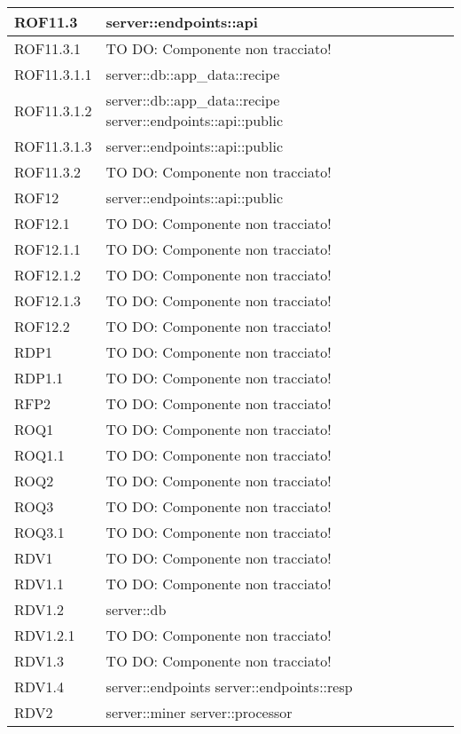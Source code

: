 \begin{center}
\begin{longtable}{| p{4cm} | p{8cm} |}
\hline
ROF11.3 & server::endpoints::api \\
\hline
ROF11.3.1 & TO DO: Componente non tracciato! \\
\hline
ROF11.3.1.1 & server::db::app\_data::recipe \\
\hline
ROF11.3.1.2 & server::db::app\_data::recipe \newline server::endpoints::api::public \\
\hline
ROF11.3.1.3 & server::endpoints::api::public \\
\hline
ROF11.3.2 & TO DO: Componente non tracciato! \\
\hline
ROF12 & server::endpoints::api::public \\
\hline
ROF12.1 & TO DO: Componente non tracciato! \\
\hline
ROF12.1.1 & TO DO: Componente non tracciato! \\
\hline
ROF12.1.2 & TO DO: Componente non tracciato! \\
\hline
ROF12.1.3 & TO DO: Componente non tracciato! \\
\hline
ROF12.2 & TO DO: Componente non tracciato! \\
\hline
RDP1 & TO DO: Componente non tracciato! \\
\hline
RDP1.1 & TO DO: Componente non tracciato! \\
\hline
RFP2 & TO DO: Componente non tracciato! \\
\hline
ROQ1 & TO DO: Componente non tracciato! \\
\hline
ROQ1.1 & TO DO: Componente non tracciato! \\
\hline
ROQ2 & TO DO: Componente non tracciato! \\
\hline
ROQ3 & TO DO: Componente non tracciato! \\
\hline
ROQ3.1 & TO DO: Componente non tracciato! \\
\hline
RDV1 & TO DO: Componente non tracciato! \\
\hline
RDV1.1 & TO DO: Componente non tracciato! \\
\hline
RDV1.2 & server::db \\
\hline
RDV1.2.1 & TO DO: Componente non tracciato! \\
\hline
RDV1.3 & TO DO: Componente non tracciato! \\
\hline
RDV1.4 & server::endpoints \newline server::endpoints::resp \\
\hline
RDV2 & server::miner \newline server::processor \\

\end{longtable}
\end{center}
